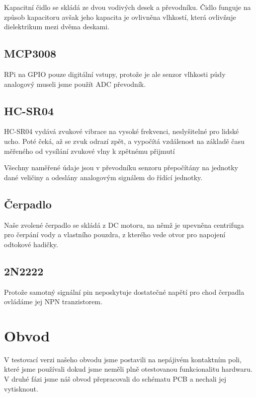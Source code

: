 \documentclass[11pt,a4paper]{article}
\begin{document}
Kapacitní čidlo se skládá ze dvou vodivých desek a převodníku. Čidlo funguje na způsob kapacitoru avšak jeho kapacita je ovlivněna vlhkostí, která ovlivňuje dielektrikum mezi dvěma deskami.

\subsection*{MCP3008}

RPi na GPIO pouze digitální vstupy, protože je ale senzor vlhkosti půdy analogový museli jsme použít ADC převodník.

\subsection*{HC-SR04}

HC-SR04 vydává zvukové vibrace na vysoké frekvenci, neslyšitelné pro lidské ucho. Poté čeká, až se zvuk odrazí zpět, a vypočítá vzdálenost na základě času měřeného od vysílání zvukové vlny k zpětnému přijmutí

Všechny naměřené údaje jsou v převodníku senzoru přepočítány na jednotky dané veličiny a odeslány analogovým signálem do řídící jednotky.

\subsection*{Čerpadlo}

Naše zvolené čerpadlo se skládá z DC motoru, na němž je upevněna centrifuga pro čerpání vody a vlastního pouzdra, z kterého vede otvor pro napojení odtokové hadičky.

\subsection*{2N2222}

Protože samotný signální pin neposkytuje dostatečné napětí pro chod čerpadla ovládáme jej NPN tranzistorem.

\section*{Obvod}

V testovací verzi našeho obvodu jsme postavili na nepájivém kontaktním poli, které jsme používali dokud jsme neměli plně otestovanou funkcionalitu hardwaru. V druhé fázi jsme náš obvod přepracovali do schématu PCB a nechali jej vytisknout.
\end{document}
